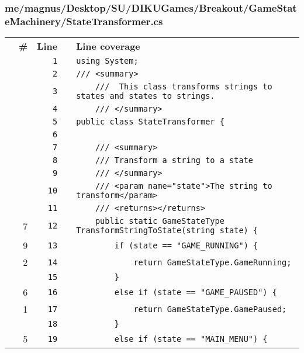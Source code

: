 \documentclass[a4paper,landscape,10pt]{article}
\begin{document}
\subsubsection{me/magnus/Desktop/SU/DIKUGames/Breakout/GameStateMachinery/StateTransformer.cs}
\begin{longtable}[l]{lrrll}
\textbf{} & \textbf{\#} & \textbf{Line} & \textbf{} & \textbf{Line coverage}\\
\cellcolor{gray} &  & \verb~1~ & & \verb~using System;~\\
\cellcolor{gray} &  & \verb~2~ & & \verb~/// <summary>~\\
\cellcolor{gray} &  & \verb~3~ & & \verb~    ///  This class transforms strings to states and states to strings.~\\
\cellcolor{gray} &  & \verb~4~ & & \verb~    /// </summary>~\\
\cellcolor{gray} &  & \verb~5~ & & \verb~public class StateTransformer {~\\
\cellcolor{gray} &  & \verb~6~ & & \verb~~\\
\cellcolor{gray} &  & \verb~7~ & & \verb~    /// <summary>~\\
\cellcolor{gray} &  & \verb~8~ & & \verb~    /// Transform a string to a state~\\
\cellcolor{gray} &  & \verb~9~ & & \verb~    /// </summary>~\\
\cellcolor{gray} &  & \verb~10~ & & \verb~    /// <param name="state">The string to transform</param>~\\
\cellcolor{gray} &  & \verb~11~ & & \verb~    /// <returns></returns>~\\
\cellcolor{green} & 7 & \verb~12~ & & \verb~    public static GameStateType TransformStringToState(string state) {~\\
\cellcolor{green} & 9 & \verb~13~ & & \verb~        if (state == "GAME_RUNNING") {~\\
\cellcolor{green} & 2 & \verb~14~ & & \verb~            return GameStateType.GameRunning;~\\
\cellcolor{gray} &  & \verb~15~ & & \verb~        }~\\
\cellcolor{green} & 6 & \verb~16~ & & \verb~        else if (state == "GAME_PAUSED") {~\\
\cellcolor{green} & 1 & \verb~17~ & & \verb~            return GameStateType.GamePaused;~\\
\cellcolor{gray} &  & \verb~18~ & & \verb~        }~\\
\cellcolor{green} & 5 & \verb~19~ & & \verb~        else if (state == "MAIN_MENU") {~\\

\end{longtable}
\end{document}
